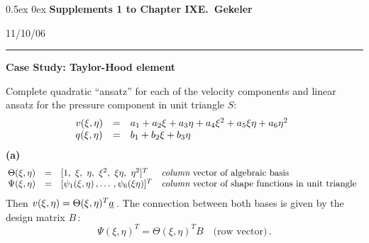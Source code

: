 \documentclass[12pt,a4paper,USenglish,twoside]{book}
\begin{document}
\setlength{\fboxsep}{1ex}
\newcommand{\Release}{11/10/06}
\addtolength{\abovedisplayshortskip}{-1ex}
\setlength{\fboxsep}{1.5ex}
\parskip0.5ex
\parindent0ex
\mainmatter
%
{\large\bf Supplements 1 to Chapter IX\hfill E.\ Gekeler
}
\par
\vspace{-1mm}
\hfill{\footnotesize\Release\ }
\par
\vspace{-2mm}
\rule{\textwidth}{1pt}
\par\vspace{2ex}
{\bf Case Study: Taylor-Hood element}
\par
%
Complete quadratic ``ansatz'' for each of the velocity components and linear ansatz for 
the pressure component in unit triangle $S$:
\[
\ba{.}{lll}
v(\xi,\eta) &=& a_1 + a_2\xi + a_3\eta + a_4\xi^2 + a_5\xi\eta + a_6\eta^2\\
q(\xi,\eta) &=& b_1 + b_2\xi + b_3\eta
\ea{.}
\]
{\bf (a)} 
\[
\ba{.}{llll}
\Theta(\xi,\eta) &=& [1,\ \xi,\ \eta,\ \xi^2 ,\ \xi\eta, \ \eta^2]^T
& \text{{\em column} vector of algebraic basis}\\
\Psi(\xi,\eta) &=& [\psi_1(\xi,\eta)\,,\ldots\,, \psi_6(\xi\eta)]^T
& \text{{\em column} vector of shape functions in unit triangle}
\ea{.}
\]
Then $v(\xi,\eta) = \Theta(\xi,\eta)^T\a$\,. The connection between both bases
is given by  the design matrix $B$\,:
\begin{equation}\label{e1}
\Psi(\xi,\eta)^T = \Theta(\xi,\eta)^TB \quad \text{(row vector)}\,.
\end{equation}
\end{document}
